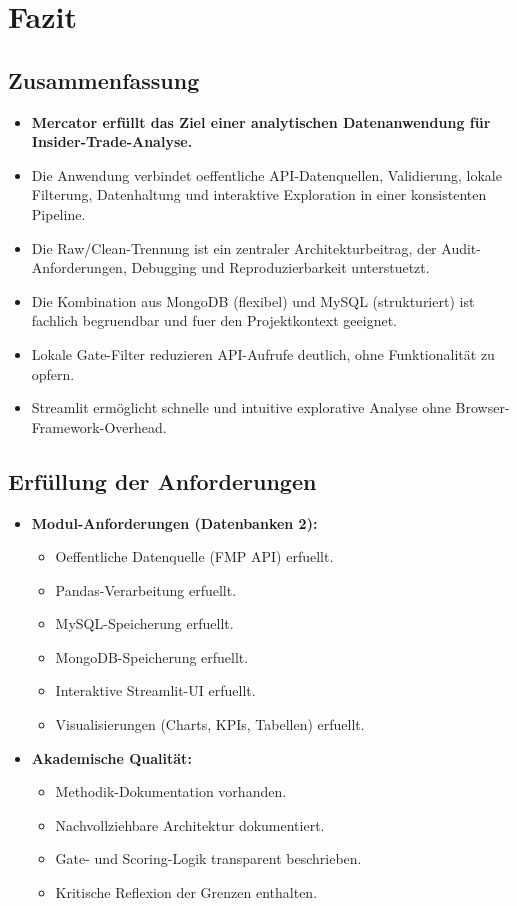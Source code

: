 \section{Fazit}

\subsection{Zusammenfassung}
\begin{itemize}
  \item \textbf{Mercator erfüllt das Ziel einer analytischen Datenanwendung für Insider-Trade-Analyse.} %
  \item Die Anwendung verbindet oeffentliche API-Datenquellen, Validierung, lokale Filterung, Datenhaltung und interaktive Exploration in einer konsistenten Pipeline. %
  \item Die Raw/Clean-Trennung ist ein zentraler Architekturbeitrag, der Audit-Anforderungen, Debugging und Reproduzierbarkeit unterstuetzt. %
  \item Die Kombination aus MongoDB (flexibel) und MySQL (strukturiert) ist fachlich begruendbar und fuer den Projektkontext geeignet. %
  \item Lokale Gate-Filter reduzieren API-Aufrufe deutlich, ohne Funktionalität zu opfern. %
  \item Streamlit ermöglicht schnelle und intuitive explorative Analyse ohne Browser-Framework-Overhead. %
\end{itemize}

\subsection{Erfüllung der Anforderungen}
\begin{itemize}
  \item \textbf{Modul-Anforderungen (Datenbanken 2):}
    \begin{itemize}
      \item Oeffentliche Datenquelle (FMP API) erfuellt.
      \item Pandas-Verarbeitung erfuellt.
      \item MySQL-Speicherung erfuellt.
      \item MongoDB-Speicherung erfuellt.
      \item Interaktive Streamlit-UI erfuellt.
      \item Visualisierungen (Charts, KPIs, Tabellen) erfuellt.
    \end{itemize}
  \item \textbf{Akademische Qualität:}
    \begin{itemize}
      \item Methodik-Dokumentation vorhanden.
      \item Nachvollziehbare Architektur dokumentiert.
      \item Gate- und Scoring-Logik transparent beschrieben.
      \item Kritische Reflexion der Grenzen enthalten.
    \end{itemize}
\end{itemize}


